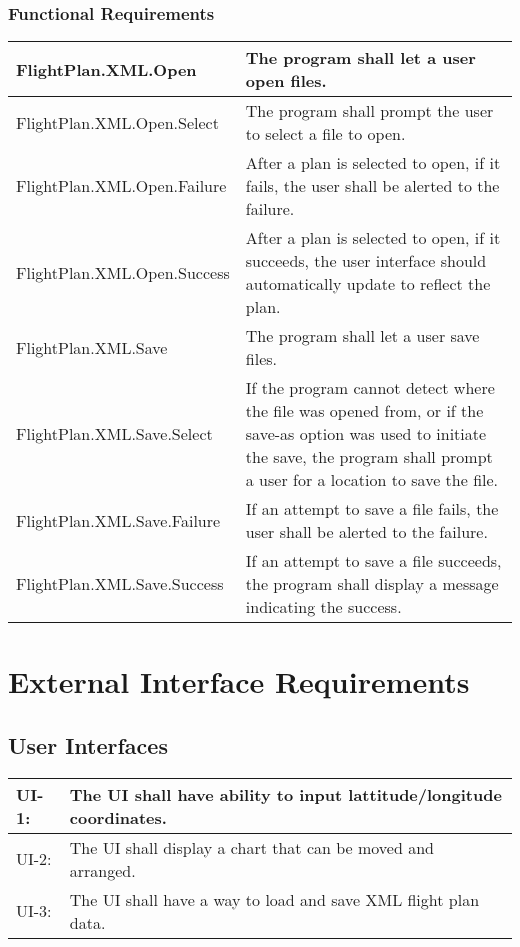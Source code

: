 \documentclass[12pt, letterpaper]{article}
\begin{document}
          \subsubsection{Functional Requirements}
          \begin{tabularx}{\textwidth}{|l|X|} \hline
            FlightPlan.XML.Open & The program shall let a user open files. \\ \hline
            FlightPlan.XML.Open.Select & The program shall prompt the user to select a file to open. \\ \hline
            FlightPlan.XML.Open.Failure & After a plan is selected to open, if it fails, the user shall be alerted to the failure. \\ \hline
            FlightPlan.XML.Open.Success & After a plan is selected to open, if it succeeds, the user interface should automatically update to reflect the plan. \\ \hline
            FlightPlan.XML.Save & The program shall let a user save files. \\ \hline
            FlightPlan.XML.Save.Select & If the program cannot detect where the file was opened from,
                or if the save-as option was used to initiate the save, the program shall prompt a user for a location to save the file. \\ \hline
            FlightPlan.XML.Save.Failure & If an attempt to save a file fails, the user shall be alerted to the failure. \\ \hline
            FlightPlan.XML.Save.Success & If an attempt to save a file succeeds, the program shall display a message indicating the success. \\ \hline
          \end{tabularx}

\section{External Interface Requirements}
  \subsection{User Interfaces}
    \begin{tabularx}{\textwidth}{|l|X|} \hline
      UI-1: & The UI shall have ability to input lattitude/longitude coordinates. \\ \hline
      UI-2: & The UI shall display a chart that can be moved and arranged. \\ \hline
      UI-3: & The UI shall have a way to load and save XML flight plan data. \\ \hline
    \end{tabularx}
\end{document}

